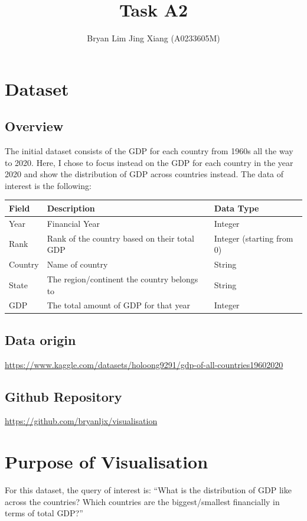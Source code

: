 \documentclass[a4paper, 11pt]{article}
\author{Bryan Lim Jing Xiang (A0233605M)}
\date{}
\title{Task A2}
\begin{document}
\maketitle
\section{Dataset}
\label{sec:org292d70d}
\subsection{Overview}
\label{sec:org72141e9}
The initial dataset consists of the GDP for each country from 1960s all the way to 2020. Here, I chose to focus instead on the GDP for each country in the year 2020 and show the distribution of GDP across countries instead. The data of interest is the following:

\begin{center}
\begin{tabular}{lll}
Field & Description & Data Type\\[0pt]
\hline
Year & Financial Year & Integer\\[0pt]
Rank & Rank of the country based on their total GDP & Integer (starting from 0)\\[0pt]
Country & Name of country & String\\[0pt]
State & The region/continent the country belongs to & String\\[0pt]
GDP & The total amount of GDP for that year & Integer\\[0pt]
\end{tabular}
\end{center}
\subsection{Data origin}
\label{sec:org3bd4fa1}
\url{https://www.kaggle.com/datasets/holoong9291/gdp-of-all-countries19602020}
\subsection{Github Repository}
\label{sec:orgc768415}
\url{https://github.com/bryanljx/visualisation}
\section{Purpose of Visualisation}
\label{sec:orgdab3d30}
For this dataset, the query of interest is: ``What is the distribution of GDP like across the countries? Which countries are the biggest/smallest financially in terms of total GDP?''
\end{document}
